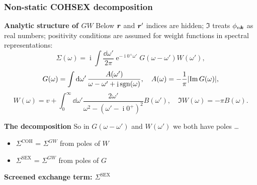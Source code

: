 \documentclass[t]{beamer}
\DeclareMathOperator{\ee}{e}
\DeclareMathOperator{\ii}{i}
\DeclareMathOperator{\sgn}{sgn}
\begin{document}
\begin{frame}[allowframebreaks]
\frametitle{Non-static COHSEX decomposition}

\textbf{Analytic structure of $GW$} Below $\vb*{r}$ and $\vb*{r}'$ indices are hidden;
$\Im$ treats $\phi_{n \vb*{k}}$ as real numbers;
positivity conditions are assumed for 
weight functions in spectral representations:
\begin{equation}
    \Sigma(\omega) = \ii \int \frac{\dd{\omega'}}{2\pi} 
    \ee^{- \ii 0^+ \omega'} G(\omega - \omega') W(\omega') ,
\end{equation}
\begin{equation}
    G(\omega) = \int \dd{\omega'} \frac{A(\omega')}{\omega - \omega' + \ii \sgn(\omega)}, 
    \quad A(\omega) = - \frac{1}{\pi} \abs{\Im G(\omega)},
\end{equation}
\begin{equation}
    W(\omega) = v + \int_{0}^{\infty} \dd{\omega'}
    \frac{2 \omega'}{\omega^2 - (\omega' - \ii 0^+)^2} B(\omega'), \quad 
    \Im W(\omega) = - \pi B(\omega).
\end{equation}

\textbf{The decomposition} So in $G(\omega - \omega')$ and $W(\omega')$
we both have poles \dots
\begin{itemize}
    \item $\Sigma^{\text{COH}}$ = $\Sigma^{GW}$ from poles of $W$ 
    \item $\Sigma^{\text{SEX}}$ = $\Sigma^{GW}$ from poles of $G$
\end{itemize} 

\textbf{Screened exchange term: $\Sigma^{\text{SEX}}$} 


\end{frame}
\end{document}
